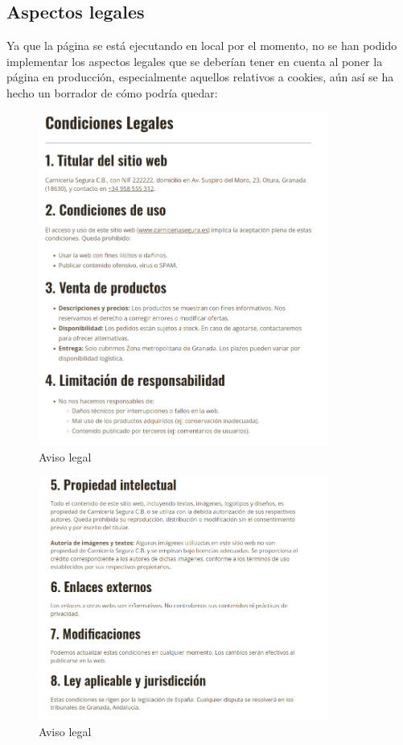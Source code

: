 \documentclass[a4paper]{article}
\begin{document}
\subsection{Aspectos legales}

Ya que la página se está ejecutando en local por el momento, no se han podido implementar los aspectos legales que se deberían tener en cuenta al poner la página en producción, especialmente aquellos relativos a cookies, aún así se ha hecho un borrador de cómo podría quedar:

\begin{figure}[H]
    \centering
    \includegraphics[width=0.85\textwidth]{images/legal1.png}
    \caption{Aviso legal}
\end{figure}

\begin{figure}[H]
    \centering
    \includegraphics[width=0.85\textwidth]{images/legal2.png}
    \caption{Aviso legal}
\end{figure}
\end{document}

